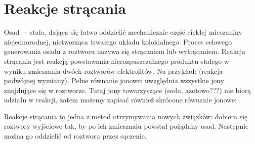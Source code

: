 \section{Reakcje strącania} 
Osad –- stała, dająca się łatwo oddzielić mechanicznie część ciekłej mieszaniny niejednorodnej, nietworząca trwałego układu koloidalnego. Proces celowego generowania osadu z roztworu nazywa się strącaniem lub wytrącaniem. %
Reakcja strącania jest reakcją powstawania nierozpuszczalnego produktu stałego w wyniku zmieszania dwóch roztworów elektrolitów.
Na przykład:  (reakcja podwójnej wymiany).
Pełne równanie jonowe:
 uwzględnia wszystkie jony znajdujące się w roztworze.
Tutaj jony towarzyszące (sodu, azotowo???) nie biorą udziału w reakcji, zatem możemy zapisać również skrócone równanie jonowe: .

Reakcje strącania to jedna z metod otrzymywania nowych związków: dobiera się roztwory wyjściowe tak, by po ich zmiesznaiu powstał pożądany osad. Następnie można go oddzielić od roztworu przez sączenie.